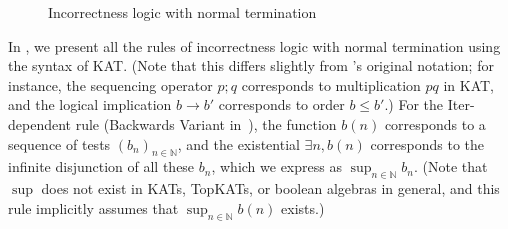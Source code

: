 \begin{figure}
    \caption{Incorrectness logic with normal termination}\label{fig: normal terminating Inc rule}
\end{figure}

In , we present all the rules of
incorrectness logic with normal termination using the syntax of KAT.  (Note
that this differs slightly from \citeauthor{OHearn_2020}'s
original notation; for instance, the sequencing operator \(p;q\) corresponds to
multiplication \(pq\) in KAT, and the logical implication \(b → b'\)
corresponds to order \(b \leq b'\).)  For the Iter-dependent rule (Backwards
Variant in~\cite{OHearn_2020}), the function \(b(n)\) corresponds
to a sequence of tests \((b_n)_{n \in ℕ}\), and the existential
\(\exists n, b(n)\) corresponds to the infinite disjunction of all these
\(b_n\), which we express as \(\sup_{n \in ℕ} b_n\).  (Note that \(\sup\)
does not exist in KATs, TopKATs, or boolean algebras in general, and this rule
implicitly assumes that \(\sup_{n \in ℕ} b(n)\) exists.)

